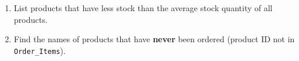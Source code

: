 \documentclass[12pt,a4paper]{article}
\begin{document}
\begin{enumerate}
    \item List products that have less stock than the average stock quantity of all products.







    \item Find the names of products that have \textbf{never} been ordered (product ID not in \texttt{Order\_Items}).


\end{enumerate}
\end{document}
